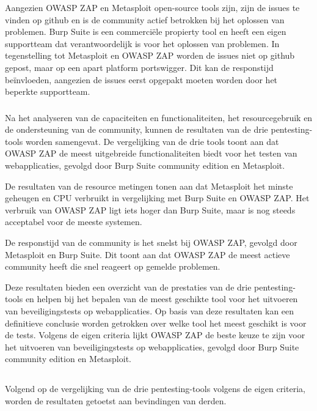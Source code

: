 Aangezien OWASP ZAP en Metasploit open-source tools zijn, zijn de issues te vinden op github en is de community actief
betrokken bij het oplossen van problemen. Burp Suite is een commerciële propierty tool en heeft een eigen supportteam dat 
verantwoordelijk is voor het oplossen van problemen. In tegenstelling tot Metasploit en OWASP ZAP worden de issues niet 
op github gepost, maar op een apart platform portswigger. Dit kan de responstijd beïnvloeden, 
aangezien de issues eerst opgepakt moeten worden door het beperkte supportteam.

\subsubsection{}
Na het analyseren van de capaciteiten en functionaliteiten, het resourcegebruik en de ondersteuning van de community,
kunnen de resultaten van de drie pentesting-tools worden samengevat. De vergelijking van de drie tools toont aan dat
OWASP ZAP de meest uitgebreide functionaliteiten biedt voor het testen van webapplicaties, gevolgd door Burp Suite 
community edition en Metasploit. 

De resultaten van de resource metingen tonen aan dat Metasploit het minste 
geheugen en CPU verbruikt in vergelijking met Burp Suite en OWASP ZAP. Het verbruik van OWASP ZAP ligt iets hoger dan 
Burp Suite, maar is nog steeds acceptabel voor de meeste systemen. 

De responstijd van de community is het snelst bij OWASP ZAP, 
gevolgd door Metasploit en Burp Suite. Dit toont aan dat OWASP ZAP de meest actieve community heeft die snel reageert op 
gemelde problemen.

Deze resultaten bieden een overzicht van de prestaties van de drie pentesting-tools en helpen bij het bepalen van de 
meest geschikte tool voor het uitvoeren van beveiligingstests op webapplicaties. Op basis van deze resultaten kan een 
definitieve conclusie worden getrokken over welke tool het meest geschikt is voor de tests. Volgens de eigen criteria 
lijkt OWASP ZAP de beste keuze te zijn voor het uitvoeren van beveiligingstests op webapplicaties, gevolgd door Burp Suite 
community edition en Metasploit. 

\subsection{}
Volgend op de vergelijking van de drie pentesting-tools volgens de eigen criteria, worden de resultaten getoetst aan bevindingen van 
derden.

